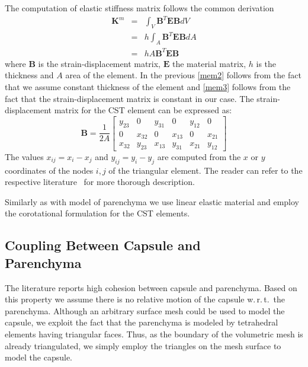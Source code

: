 \documentclass{acm_proc_article-sp}
\def\wrt{w.\,r.\,t.}
\newcommand{\Mat}[1]{\mathbf{#1}}
\begin{document}
The computation of elastic stiffness matrix follows the common derivation
%
\begin{eqnarray}
  \Mat{K}^m & = & \int_V \Mat{B}^T \Mat{E} \Mat{B} dV     \label{mem1} \\
            & = & h \int_A \Mat{B}^T \Mat{E} \Mat{B} dA   \label{mem2} \\
            & = & h A \Mat{B}^T \Mat{E} \Mat{B}           \label{mem3}
\end{eqnarray}
%
where $\Mat{B}$ is the strain-displacement matrix, $\Mat{E}$ the material
matrix, $h$ is the thickness and $A$ area of the element. In the previous
\eqref{mem2} follows from the fact that we assume constant thickness of the
element and \eqref{mem3} follows from the fact that the strain-displacement
matrix is constant in our case. The strain-displacement matrix for the CST
element can be expressed as:
%
\begin{equation}
  \Mat{B} = \frac{1}{2A} \begin{bmatrix}
    y_{23} & 0      & y_{31} & 0      & y_{12} & 0 \\
         0 & x_{32} & 0      & x_{13} & 0      & x_{21} \\
    x_{32} & y_{23} & x_{13} & y_{31} & x_{21} & y_{12}
  \end{bmatrix}
\end{equation}
%
The values $x_{ij} = x_i - x_j$ and $y_{ij} = y_i - y_j$ are computed from
the $x$ or $y$ coordinates of the nodes $i,j$ of the triangular element.
The reader can refer to the respective literature~\cite{Felippa2003} for more thorough
description.

Similarly as with model of parenchyma we use linear elastic material and employ
the corotational formulation for the CST elements.


\subsection{Coupling Between Capsule and\\Parenchyma} %
The literature reports high cohesion between capsule and parenchyma.
Based on this property we assume there is no relative motion of the capsule \wrt\ the parenchyma.
Although an arbitrary surface mesh could be used to model the capsule, we exploit 
the fact that the parenchyma is modeled by tetrahedral elements having
triangular faces. Thus, as the boundary of the volumetric mesh is already
triangulated, we simply employ the triangles on the mesh surface to model the capsule.
\end{document}
